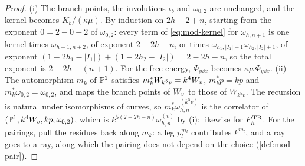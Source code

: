 \begin{proof}
(i) The branch points, the involutions $\iota_b$ and $\omega_{0,2}$ are unchanged, and the kernel becomes $K_b/(\kappa\mu)$. By induction on $2h-2+n$, starting from the exponent $0=2-0-2$ of $\omega_{0,2}$: every term of \eqref{eq:mod-kernel} for $\omega_{h,n+1}$ is one kernel times $\omega_{h-1,n+2}$, of exponent $2-2h-n$, or times $\omega_{h_1,|I_1|+1}\omega_{h_2,|I_2|+1}$, of exponent $(1-2h_1-|I_1|)+(1-2h_2-|I_2|)=2-2h-n$, so the total exponent is $2-2h-(n+1)$. For the free energy, $\Phi_{y\dd x}$ becomes $\kappa\mu\,\Phi_{y\dd x}$. (ii) The automorphism $m_k$ of $\mathbb{P}^1$ satisfies $m_k^*W_{k^5v}=k^4W_{v}$, $m_k^*p=kp$ and $m_k^*\omega_{0,2}=\omega_{0,2}$, and maps the branch points of $W_{v}$ to those of $W_{k^5v}$. The recursion is natural under isomorphisms of curves, so $m_k^*\omega^{(k^5v)}_{h,n}$ is the correlator of $(\mathbb{P}^1,k^4W_{v},kp,\omega_{0,2})$, which is $k^{5(2-2h-n)}\omega^{(v)}_{h,n}$ by (i); likewise for $F^{\mathrm{TR}}_h$. For the pairings, pull the residues back along $m_k$: a leg $p_l^{m_l}$ contributes $k^{m_l}$, and a ray goes to a ray, along which the pairing does not depend on the choice (\cref{def:mod-pair}).
\end{proof}

